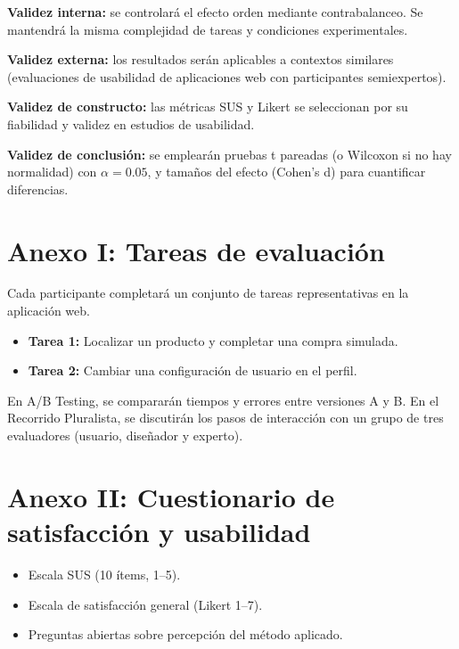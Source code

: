 \documentclass[a4paper,12pt]{report}
\begin{document}
\textbf{Validez interna:} se controlará el efecto orden mediante contrabalanceo. Se mantendrá la misma complejidad de tareas y condiciones experimentales.  

\textbf{Validez externa:} los resultados serán aplicables a contextos similares (evaluaciones de usabilidad de aplicaciones web con participantes semiexpertos).  

\textbf{Validez de constructo:} las métricas SUS y Likert se seleccionan por su fiabilidad y validez en estudios de usabilidad.  

\textbf{Validez de conclusión:} se emplearán pruebas t pareadas (o Wilcoxon si no hay normalidad) con $\alpha=0.05$, y tamaños del efecto (Cohen’s d) para cuantificar diferencias.


\cleardoublepage

\printbibliography[heading=bibintoc,title={Bibliografía}]
\appendix

\chapter{Anexo I: Tareas de evaluación}
Cada participante completará un conjunto de tareas representativas en la aplicación web.  
\begin{itemize}
    \item \textbf{Tarea 1:} Localizar un producto y completar una compra simulada.  
    \item \textbf{Tarea 2:} Cambiar una configuración de usuario en el perfil.  
\end{itemize}
En A/B Testing, se compararán tiempos y errores entre versiones A y B.  
En el Recorrido Pluralista, se discutirán los pasos de interacción con un grupo de tres evaluadores (usuario, diseñador y experto).

\chapter{Anexo II: Cuestionario de satisfacción y usabilidad}
\label{anexo:encuesta}
\begin{itemize}
    \item Escala SUS (10 ítems, 1--5).  
    \item Escala de satisfacción general (Likert 1--7).  
    \item Preguntas abiertas sobre percepción del método aplicado.  
\end{itemize}
\end{document}

